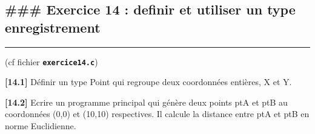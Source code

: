 \documentclass[11pt]{article}
\begin{document}
\hypertarget{exercice-14-definir-et-utiliser-un-type-enregistrement}{%
\subsection{\#\#\# Exercice 14 : definir et utiliser un type
enregistrement}\label{exercice-14-definir-et-utiliser-un-type-enregistrement}}

\begin{center}\rule{0.5\linewidth}{0.5pt}\end{center}

(cf fichier \textbf{\texttt{exercice14.c}})

\textbf{{[}14.1{]}} Définir un type Point qui regroupe deux coordonnées
entières, X et Y.

\textbf{{[}14.2{]}} Ecrire un programme principal qui génère deux points
ptA et ptB au coordonnées (0,0) et (10,10) respectives. Il calcule la
distance entre ptA et ptB en norme Euclidienne.
\end{document}
